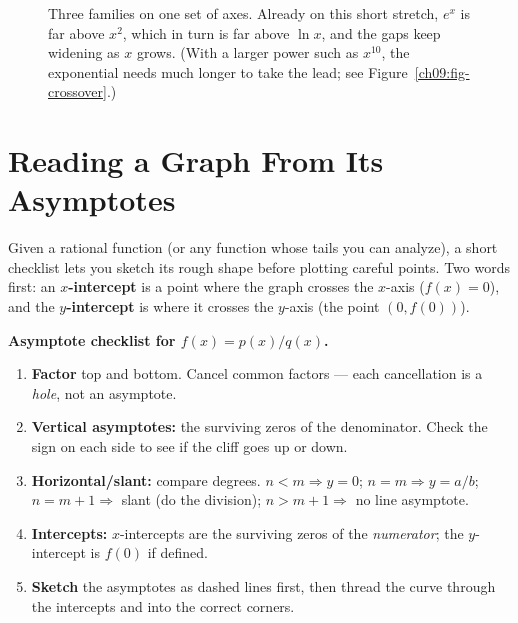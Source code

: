 \begin{figure}[htbp]
\centering
{}
\caption{Three families on one set of axes. Already on this short stretch,
$e^x$ is far above $x^2$, which in turn is far above $\ln x$, and the gaps keep
widening as $x$ grows. (With a larger power such as $x^{10}$, the exponential
needs much longer to take the lead; see Figure~\ref{ch09:fig-crossover}.)}
\label{ch09:fig-hierarchy}
\end{figure}

\section{Reading a Graph From Its Asymptotes}
\label{ch09:reading}

Given a rational function (or any function whose tails
you can analyze), a short checklist lets you sketch its rough shape before
plotting careful points. Two words first: an \textbf{$x$-intercept} is a point
where the graph crosses the $x$-axis ($f(x)=0$), and the
\textbf{$y$-intercept} is where it crosses the $y$-axis (the point $(0,f(0))$).

\begin{focusbox}
\textbf{Asymptote checklist for $f(x)=p(x)/q(x)$.}
\begin{enumerate}
\item \textbf{Factor} top and bottom. Cancel common factors --- each cancellation
is a \emph{hole}, not an asymptote.
\item \textbf{Vertical asymptotes:} the surviving zeros of the denominator. Check
the sign on each side to see if the cliff goes up or down.
\item \textbf{Horizontal/slant:} compare degrees. $n<m\Rightarrow y=0$;
$n=m\Rightarrow y=a/b$; $n=m+1\Rightarrow$ slant (do the division); $n>m+1
\Rightarrow$ no line asymptote.
\item \textbf{Intercepts:} $x$-intercepts are the surviving zeros of the
\emph{numerator}; the $y$-intercept is $f(0)$ if defined.
\item \textbf{Sketch} the asymptotes as dashed lines first, then thread the curve
through the intercepts and into the correct corners.
\end{enumerate}
\end{focusbox}

